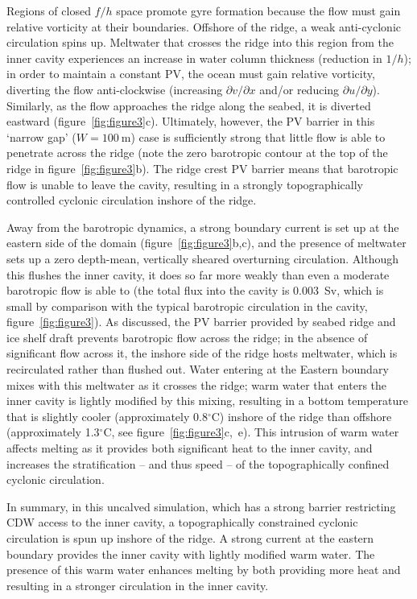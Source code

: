 \documentclass[draft]{agujournal2019}
\begin{document}
Regions of closed $f/h$ space promote gyre formation because the flow must gain relative vorticity at their boundaries. Offshore of the ridge, a weak anti-cyclonic circulation spins up. Meltwater that crosses the ridge into this region from the inner cavity experiences an increase in water column thickness (reduction in $1/h$); in order to maintain a constant PV, the ocean must gain relative vorticity, diverting the flow anti-clockwise (increasing $\partial v / \partial x$ and/or reducing $\partial u / \partial y$). Similarly, as the flow approaches the ridge along the seabed, it is diverted eastward (figure~\ref{fig:figure3}c). Ultimately, however, the PV barrier in this `narrow gap' ($W=100~\text{m}$) case is sufficiently strong that little flow is able to penetrate across the ridge (note the zero barotropic contour at the top of the ridge in figure~\ref{fig:figure3}b). The ridge crest PV barrier means that barotropic flow is unable to leave the cavity, resulting in a strongly topographically controlled cyclonic circulation inshore of the ridge.

Away from the barotropic dynamics, a strong boundary current is set up at the eastern side of the domain (figure~\ref{fig:figure3}b,c), and the presence of meltwater sets up a zero depth-mean, vertically sheared overturning circulation. Although this flushes the inner cavity, it does so far more weakly than even a moderate barotropic flow is able to (the total flux into the cavity is 0.003~Sv, which is small by comparison with the typical barotropic circulation in the cavity, figure~\ref{fig:figure3}). As discussed, the PV barrier provided by seabed ridge and ice shelf draft prevents barotropic flow across the ridge; in the absence of significant flow across it, the inshore side of the ridge hosts meltwater, which is recirculated rather than flushed out. Water entering at the Eastern boundary mixes with this meltwater as it crosses the ridge; warm water that enters the inner cavity is lightly modified by this mixing, resulting in a bottom temperature that is slightly cooler (approximately 0.8${}^\circ$C) inshore of the ridge than offshore (approximately 1.3${}^\circ$C, see figure~\ref{fig:figure3}c,~e). This intrusion of warm water affects melting as it provides both significant heat to the inner cavity, and increases the stratification -- and thus speed -- of the topographically confined cyclonic circulation.

In summary, in this uncalved simulation, which has a strong barrier restricting CDW access to the inner cavity, a topographically constrained cyclonic circulation is spun up inshore of the ridge. A strong current at the eastern boundary provides the inner cavity with lightly modified warm water. The presence of this warm water enhances melting by both providing more heat and resulting in a stronger circulation in the inner cavity.
\end{document}
